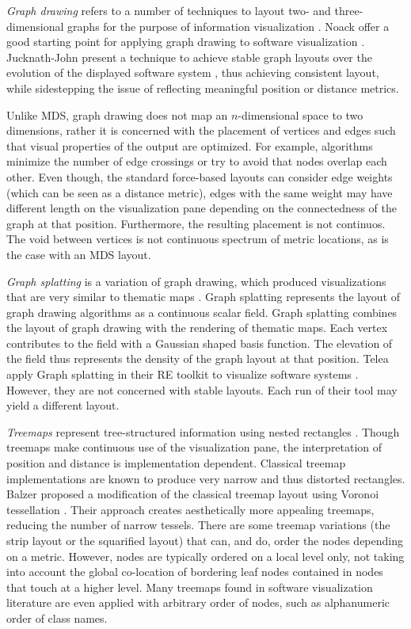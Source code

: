 \emph{Graph drawing} refers to a number of techniques to layout two- and three-dimensional graphs for the purpose of information visualization \cite{Ware04a,Kauf01b}. Noack \etal offer a good starting point for applying graph drawing to software visualization \cite{Noac05a}. Jucknath-John \etal present a technique to achieve stable graph layouts over the evolution of the displayed software system \cite{Juck06a}, thus achieving consistent layout, while sidestepping the issue of reflecting meaningful position or distance metrics.

Unlike MDS, graph drawing does not map an $n$-dimensional space to two dimensions, rather it is concerned with the placement of vertices and edges such that visual properties of the output are optimized. For example, algorithms minimize the number of edge crossings or try to avoid that nodes overlap each other. Even though, the standard force-based layouts can consider edge weights (which can be seen as a distance metric), edges with the same weight may have different length on the visualization pane depending on the connectedness of the graph at that position. Furthermore, the resulting placement is not continuos. The void between vertices is not continuous spectrum of metric locations, as is the case with an MDS layout.

\emph{Graph splatting} is a variation of graph drawing, which produced visualizations that are very similar to thematic maps \cite{Lier03a}. Graph splatting represents the layout of graph drawing algorithms as a continuous scalar field. Graph splatting combines the layout of graph drawing with the rendering of thematic maps. Each vertex contributes to the field with a Gaussian shaped basis function. The elevation of the field thus represents the density of the graph layout at that position. Telea \etal apply Graph splatting in their RE toolkit to visualize software systems \cite{Tele03a}. However, they are not concerned with stable layouts. Each run of their tool may yield a different layout.

\emph{Treemaps} represent tree-structured information using nested rectangles \cite{Ware04a}.
Though treemaps make continuous use of the visualization pane, the interpretation of position and distance is implementation dependent. Classical treemap implementations are known to produce very narrow and thus distorted rectangles. Balzer \etal proposed a modification of the classical treemap layout using Voronoi tessellation \cite{Balz05a}. Their approach creates aesthetically more appealing treemaps, reducing the number of narrow tessels. There are some treemap variations (\eg the strip layout or the squarified layout) that can, and do, order the nodes depending on a metric. However, nodes are typically ordered on a local level only, not taking into account the global co-location of bordering leaf nodes contained in nodes that touch at a higher level. Many treemaps found in software visualization literature are even applied with arbitrary order of nodes, such as alphanumeric order of class names. 

